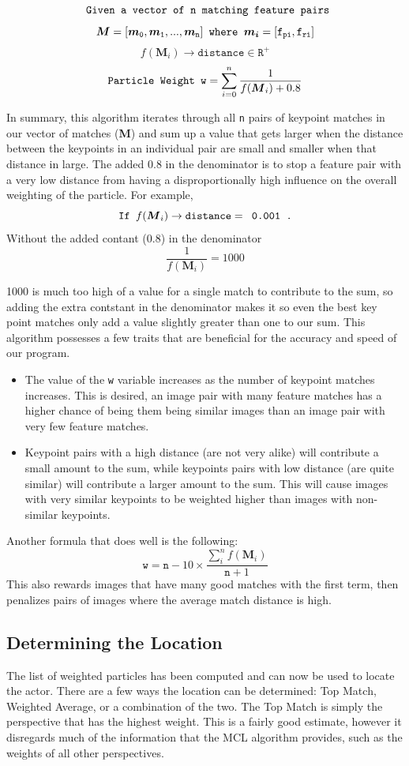 \documentclass[a4paper,11pt]{article}
\begin{document}
\[  \verb. Given a vector of . \mathtt{n} \verb. matching feature pairs. \]
\[  \boldsymbol{M} = \mathtt{ [\boldsymbol{m}_0, \boldsymbol{m}_1, ... , \boldsymbol{m}_n} ]  \verb. where . \boldsymbol{m_i} = \mathtt{ \mathtt{[f_{pi}, f_{ri}]} }   \]
\[  f(\boldsymbol{M}_i) \to \mathtt{distance} \in \mathtt{R^+}   \]
\[  \verb.Particle Weight . \mathtt{w} = \sum_{i=0}^{n} \frac 1{f(\boldsymbol{M}_i) + 0.8} \]

In summary, this algorithm iterates through all \texttt{n} pairs of keypoint matches in our vector of matches (\textbf{M}) and sum up a value that gets larger when the distance between the keypoints in an individual pair are small and smaller when that distance in large. The added 0.8 in the denominator is to stop a feature pair with a very low distance from having a disproportionally high influence on the overall weighting of the particle. For example,
\[ \verb.If . f(\boldsymbol{M}_i) \to \mathtt{distance} = \verb, 0.001 ., \]
Without the added contant (0.8) in the denominator
\[ \frac 1{f(\boldsymbol{M}_i)} = 1000\]

1000 is much too high of a value for a single match to contribute to the sum, so adding the extra contstant in the denominator makes it so even the best key point matches only add a value slightly greater than one to our sum. This algorithm possesses a few traits that are beneficial for the accuracy and speed of our program.
\begin{itemize}
  \item The value of the \texttt{w} variable increases as the number of keypoint matches increases. This is desired, an image pair with many feature matches has a higher chance of being them being similar images than an image pair with very few  feature matches.
  \item Keypoint pairs with a high distance (are not very alike) will contribute a small amount to the sum, while keypoints pairs with low distance (are quite similar) will contribute a larger amount to the sum. This will cause images with very similar keypoints to be weighted higher than images with non-similar keypoints.
\end{itemize}

Another formula that does well is the following:
\[
\mathtt{w} = \mathtt{n} - 10 \times \frac{\sum_{i}^{n} f(\boldsymbol{M}_i)}{\mathtt{n} + 1}
\]
This also rewards images that have many good matches with the first term, then penalizes pairs of images where the average match distance is high.

\subsection{Determining the Location}
The list of weighted particles has been computed and can now be used to locate the actor. There are a few ways the location can be determined: Top Match, Weighted Average, or a combination of the two. The Top Match is simply the perspective that has the highest weight. This is a fairly good estimate, however it disregards much of the information that the MCL algorithm provides, such as the weights of all other perspectives. 
\end{document}
